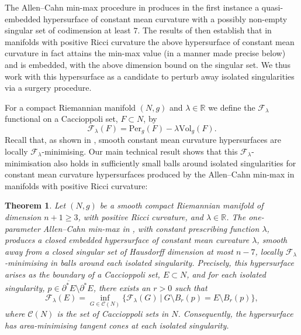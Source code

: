 \documentclass[11pt]{article}
\newtheorem{thm}{Theorem}
\begin{document}
\bigskip

The Allen--Cahn min-max procedure in \cite{bellettini-wickramasekera} produces in the first instance a quasi-embedded hypersurface of constant mean curvature with a possibly non-empty singular set of codimension at least $7$. The results of 
\cite{Bellettini-Workman} then establish that in manifolds with positive Ricci curvature the above hypersurface of constant mean curvature in fact attains the min-max value (in a manner made precise below) and is embedded, with the above dimension bound on the singular set. We thus work with this hypersurface as a candidate to perturb away isolated singularities via a surgery procedure.

\bigskip

For a compact Riemannian manifold $(N,g)$ and $\lambda \in \mathbb{R}$ we define the $\mathcal{F}_\lambda$ functional on a Caccioppoli set, $F \subset N$, by
\begin{equation*}
    \mathcal{F}_\lambda(F) = \mathrm{Per}_g(F) - \lambda \mathrm{Vol}_g(F).
\end{equation*}
Recall that, as shown in \cite[Proposition B.1]{bellettini-wickramasekera-cmc-reg}, smooth constant mean curvature hypersurfaces are locally $\mathcal{F}_\lambda$-minimising. Our main technical result shows that this $\mathcal{F}_\lambda$-minimisation also holds in sufficiently small balls around isolated singularities for constant mean curvature hypersurfaces produced by the Allen--Cahn min-max in manifolds with positive Ricci curvature:

\begin{thm}\label{thm: local minimisation in positive ricci} Let $(N,g)$ be a smooth compact Riemannian manifold of dimension $n+1 \geq 3$, with positive Ricci
curvature, and $\lambda \in \mathbb{R}$. The one-parameter Allen–Cahn min-max in \cite{bellettini-wickramasekera}, with constant prescribing function $\lambda$, produces a closed embedded hypersurface of constant mean curvature $\lambda$, smooth away from a closed singular set of Hausdorff dimension at most $n - 7$, locally $\mathcal{F}_\lambda$-minimising in balls around each isolated singularity. Precisely, this hypersurface arises as the boundary of a Caccioppoli set, $E \subset N$, and for each isolated singularity, $p \in \overline{\partial^* E} \setminus \partial^* E$, there exists an $r > 0$ such that 
\begin{equation*}
    \mathcal{F}_\lambda(E) = \inf_{G \in \mathcal{C}(N)} \{ \mathcal{F}_\lambda(G) \: | \: G \setminus B_r(p) = E \setminus B_r(p) \}, 
\end{equation*}
where $\mathcal{C}(N)$ is the set of Caccioppoli sets in $N$. Consequently, the hypersurface has area-minimising tangent cones at each isolated singularity. 
\end{thm}
\end{document}
